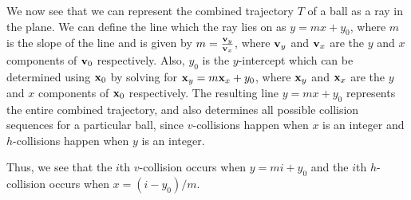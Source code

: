 We now see that we can represent the combined trajectory $T$ of a ball as a ray in the plane. We can define the line which the ray lies on as $y = mx + y_0$, where $m$ is the slope of the line and is given by $m = \frac{\mathbf{v}_y}{\mathbf{v}_x}$, where $\mathbf{v}_y$ and $\mathbf{v}_x$ are the $y$ and $x$ components of $\mathbf{v}_0$ respectively. Also, $y_0$ is the $y$-intercept which can be determined using $\mathbf{x}_0$ by solving for $\mathbf{x}_y = m \mathbf{x}_x + y_0$, where $\mathbf{x}_y$ and $\mathbf{x}_x$ are the $y$ and $x$ components of $\mathbf{x}_0$ respectively. The resulting line $y = mx + y_0$ represents the entire combined trajectory, and also determines all possible collision sequences for a particular ball, since $v$-collisions happen when $x$ is an integer and $h$-collisions happen when $y$ is an integer.

Thus, we see that the $i$th $v$-collision occurs when $y = mi + y_0$ and the $i$th $h$-collision occurs when $x = (i - y_0) / m$.
